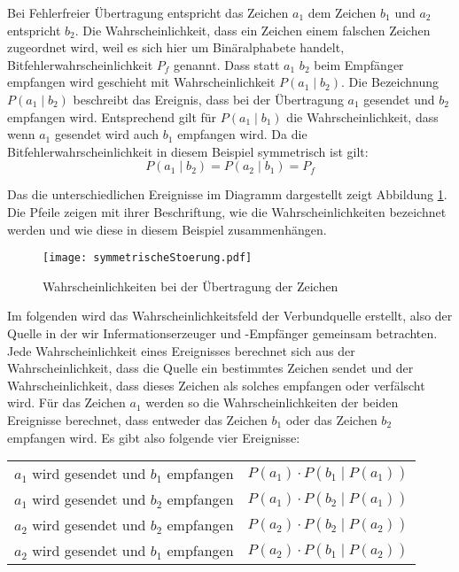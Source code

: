Bei Fehlerfreier Übertragung entspricht das Zeichen $a_1$ dem Zeichen $b_1$ und $a_2$ entspricht $b_2$. Die Wahrscheinlichkeit, dass ein Zeichen einem falschen Zeichen zugeordnet wird, weil es sich hier um Binäralphabete handelt, Bitfehlerwahrscheinlichkeit $P_f$ genannt. Dass statt $a_1$ $b_2$ beim Empfänger empfangen wird geschieht mit Wahrscheinlichkeit $P(a_1 \mid b_2)$. Die Bezeichnung $P(a_1 \mid b_2)$ beschreibt das Ereignis, dass bei der Übertragung $a_1$ gesendet und $b_2$ empfangen wird. Entsprechend gilt für $P(a_1 \mid b_1)$ die Wahrscheinlichkeit, dass wenn $a_1$ gesendet wird auch $b_1$ empfangen wird. Da die Bitfehlerwahrscheinlichkeit in diesem Beispiel symmetrisch ist gilt:
$$ P(a_1 \mid b_2) = P(a_2 \mid b_1) = P_f $$

Das die unterschiedlichen Ereignisse im Diagramm dargestellt zeigt Abbildung \ref{symStoerung}. Die Pfeile zeigen mit ihrer Beschriftung, wie die Wahrscheinlichkeiten bezeichnet werden und wie diese in diesem Beispiel zusammenhängen. 
\begin{figure}[htbp] %
	\centering
	\texttt{[image: symmetrischeStoerung.pdf]}
	\caption{Wahrscheinlichkeiten bei der Übertragung der Zeichen}
	\label{symStoerung}
\end{figure}
Im folgenden wird das Wahrscheinlichkeitsfeld der Verbundquelle erstellt, also der Quelle in der wir Infermationserzeuger und -Empfänger gemeinsam betrachten. Jede Wahrscheinlichkeit eines Ereignisses berechnet sich aus der Wahrscheinlichkeit, dass die Quelle ein bestimmtes Zeichen sendet und der Wahrscheinlichkeit, dass dieses Zeichen als solches empfangen oder verfälscht wird. Für das Zeichen $a_1$ werden so die Wahrscheinlichkeiten der beiden Ereignisse berechnet, dass entweder das Zeichen $b_1$ oder das Zeichen $b_2$ empfangen wird. Es gibt also folgende vier Ereignisse:
\begin{center}
	\begin{tabular}{cc}
		$a_1$ wird gesendet und $b_1$ empfangen & $P(a_1) \cdot P(b_1 \mid P(a_1))$ \\
		$a_1$ wird gesendet und $b_2$ empfangen & $P(a_1) \cdot P(b_2 \mid P(a_1))$ \\
		$a_2$ wird gesendet und $b_2$ empfangen & $P(a_2) \cdot P(b_2 \mid P(a_2))$ \\
		$a_2$ wird gesendet und $b_1$ empfangen & $P(a_2) \cdot P(b_1 \mid P(a_2))$ \\ 
	\end{tabular}
\end{center}

